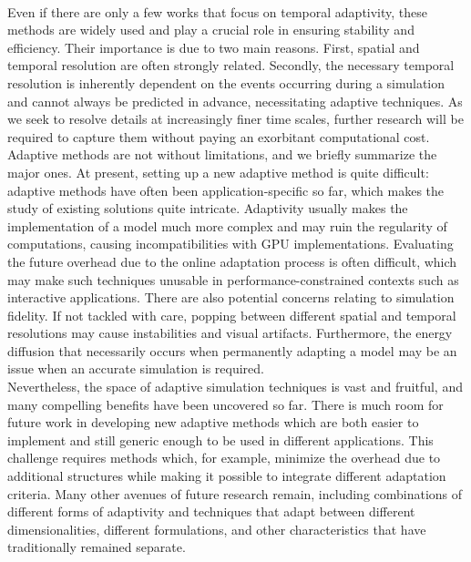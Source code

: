 \\
Even if there are only a few works that focus on temporal adaptivity, these methods are widely used and play a crucial role in ensuring stability and efficiency. Their importance is due to two main reasons. First, spatial and temporal resolution are often strongly related. Secondly, the necessary temporal resolution is inherently dependent on the events occurring during a simulation and cannot always be predicted in advance, necessitating adaptive techniques. As we seek to resolve details at increasingly finer time scales, further research will be required to capture them without paying an exorbitant computational cost.
\\
Adaptive methods are not without limitations, and we briefly summarize the major ones.
At present, setting up a new adaptive method is quite difficult: adaptive methods have often been application-specific so far, which makes the study of existing solutions quite intricate. Adaptivity usually makes the implementation of a model much more complex and may ruin the regularity of computations, causing incompatibilities with GPU implementations. Evaluating the future overhead due to the online adaptation process is often difficult, which may make such techniques unusable in performance-constrained contexts such as interactive applications.
There are also potential concerns relating to simulation fidelity. If not tackled with care, popping between different spatial and temporal resolutions may cause instabilities and visual artifacts. Furthermore, the energy diffusion that necessarily occurs when permanently adapting a model may be an issue when an accurate simulation is required.
\\
Nevertheless, the space of adaptive simulation techniques is vast and fruitful, and many compelling benefits have been uncovered so far.
There is much room for future work in developing new adaptive methods which are both easier to implement and still generic enough to be used in different applications. This challenge requires methods which, for example, minimize the overhead due to additional structures while making it possible to integrate different adaptation criteria.
Many other avenues of future research remain, including combinations of different forms of adaptivity and techniques that adapt between different dimensionalities, different formulations, and other characteristics that have traditionally remained separate.

